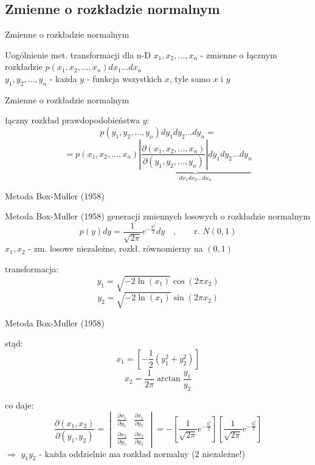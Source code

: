 \subsection{Zmienne o rozkładzie normalnym}
\begin{frame}{Zmienne o rozkładzie normalnym}
	\begin{block}{Uogólnienie met. transformacji dla n-D}
		$x_{1},x_{2},\ldots,x_{n}$ - zmienne o łącznym rozkładzie $p(x_{1},x_{2},\ldots,x_{n})dx_{1} \ldots dx_{n}$\\
		\vspace{0.5cm}
		$y_{1},y_{2},\ldots,y_{n}$ - każda $y$ - funkcja wszystkich $x$, tyle samo $x$ i $y$
	\end{block}
\end{frame}

\begin{frame}{Zmienne o rozkładzie normalnym}
	\begin{block}{łączny rozkład prawdopodobieństwa $y$:}
		\[
			p(y_{1},y_{2},\ldots,y_{n})dy_{1}dy_{2} \ldots dy_{n} =
		\]
		\[
			= p(x_{1},x_{2},\ldots,x_{n}) \underbrace{\left|\frac{\partial(x_{1},x_{2},\ldots,x_{n})}{\partial(y_{1},y_{2},\ldots,y_{n})}\right| dy_{1}dy_{2} \ldots dy_{n}}_{dx_{1}dx_{2} \ldots dx_{n}}
		\]
	\end{block}
\end{frame}
\begin{frame}{Metoda Box-Muller (1958)}
	\begin{block}{Metoda Box-Muller (1958) generacji zmiennych losowych o rozkładzie normalnym}
		\[
			p(y)dy = \frac{1}{\sqrt{2\pi}}e^{-\frac{y^{2}}{2}}dy \quad, \qquad \text{r. } N(0,1)
		\]
		$x_{1}, x_{2}$ - zm. losowe niezależne, rozkł. równomierny na $(0, 1)$
	\end{block}

	\begin{block}{transformacja:}
		\[
			y_{1} = \sqrt{-2 \ln(x_{1})} \cos(2\pi x_{2})
		\]
		\[
			y_{2} = \sqrt{-2 \ln(x_{1})} \sin(2\pi x_{2})
		\]
	\end{block}
\end{frame}
\begin{frame}{Metoda Box-Muller (1958)}
	\begin{block}{stąd:}
		\[
			x_{1} = \left[- \frac{1}{2} (y_{1}^{2} + y_{2}^{2})\right]
		\]
		\[
			x_{2} = \frac{1}{2\pi} \arctan\frac{y_{1}}{y_{2}}
		\]
	\end{block}
	
	\begin{block}{co daje:}
		\[
			\frac{\partial(x_{1}, x_{2})}{\partial(y_{1}, y_{2})} = \begin{vmatrix}
				\frac{\partial x_{1}}{\partial y_{1}} & \frac{\partial x_{1}}{\partial y_{2}} \\
				\frac{\partial x_{2}}{\partial y_{1}} & \frac{\partial x_{2}}{\partial y_{2}}
			\end{vmatrix} =
			- \left[\frac{1}{\sqrt{2\pi}} e^{-\frac{y_{1}^{2}}{2}}\right] \left[\frac{1}{\sqrt{2\pi}} e^{-\frac{y_{2}^{2}}{2}}\right]
		\]
		$\Rightarrow$ $y_{1} y_{2}$ - każda oddzielnie ma rozkład normalny (2 niezależne!)
	\end{block}
\end{frame}

